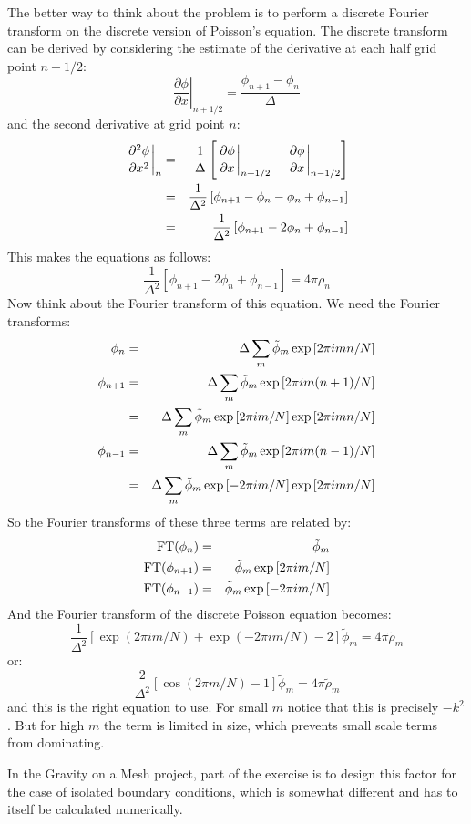 The better way to think about the problem is to perform a discrete
Fourier transform on the discrete version of Poisson's equation.
The discrete transform can be derived by considering the estimate of
the derivative at each half grid point $n + 1/2$:
\begin{equation}
\left.\frac{\partial \phi}{\partial x}\right|_{n+1/2}
= \frac{\phi_{n+1} - \phi_{n}}{\Delta}
\end{equation}
and the second derivative at grid point $n$:
\begin{eqnarray}
\left.\frac{\partial^2 \phi}{\partial x^2}\right|_n &=&
\frac{1}{\Delta}
\left[\left.\frac{\partial \phi}{\partial x}\right|_{n+1/2}
- \left.\frac{\partial \phi}{\partial x}\right|_{n-1/2}\right]\cr
&=&
\frac{1}{\Delta^2}
\left[\phi_{n+1} -\phi_n -\phi_n +\phi_{n-1}\right]\cr
&=&
\frac{1}{\Delta^2}
\left[\phi_{n+1} - 2 \phi_n +\phi_{n-1}\right]
\end{eqnarray}
This makes the equations as follows:
\begin{equation}
\frac{1}{\Delta^2}
\left[\phi_{n+1} - 2 \phi_n +\phi_{n-1}\right] =
4\pi \rho_n
\end{equation}
Now think about the Fourier transform of this equation. We need the
Fourier transforms:
\begin{eqnarray}
\phi_n &=& \Delta \sum_m \tilde\phi_m \exp\left[2\pi i mn / N\right] \cr
\phi_{n+1} &=& \Delta \sum_m \tilde\phi_m \exp\left[2\pi i m (n+1) / N\right] \cr
&=& \Delta \sum_m \tilde\phi_m \exp\left[2\pi i m /N\right]
   \exp\left[2\pi i m n / N\right] \cr
\phi_{n-1} &=& \Delta \sum_m \tilde\phi_m \exp\left[2\pi i m (n-1) / N\right] \cr
&=& \Delta \sum_m \tilde\phi_m \exp\left[- 2\pi i m /N\right]
   \exp\left[2\pi i m n / N\right]
\end{eqnarray}
So the Fourier transforms of these three terms are related by:
\begin{eqnarray}
\mathrm{FT}(\phi_n) &=& \tilde\phi_m \cr
\mathrm{FT}(\phi_{n+1}) &=& \tilde\phi_m \exp\left[2\pi i m / N\right] \cr
\mathrm{FT}(\phi_{n-1}) &=& \tilde\phi_m \exp\left[-2\pi i m / N\right]
\end{eqnarray}
And the Fourier transform of the discrete Poisson equation becomes:
\begin{equation}
\frac{1}{\Delta^2}
\left[
\exp\left(2\pi i m /N\right)
+ \exp\left(- 2\pi i m /N\right) - 2 \right] \tilde\phi_m =
4\pi \tilde\rho_m
\end{equation}
or:
\begin{equation}
\frac{2}{\Delta^2}
\left[\cos\left(2\pi m /N\right) - 1\right]
\tilde\phi_m = 4\pi \tilde\rho_m
\end{equation}
and this is the right equation to use. For small $m$ notice that this
is precisely $-k^2$. But for high $m$ the term is limited in size,
which prevents small scale terms from dominating.

In the Gravity on a Mesh project, part of the exercise is to design
this factor for the case of isolated boundary conditions, which is
somewhat different and has to itself be calculated numerically.


